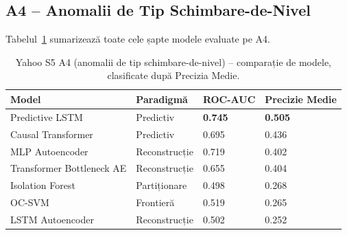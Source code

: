 \subsection{A4 -- Anomalii de Tip Schimbare-de-Nivel}

Tabelul~\ref{tab:yahoo-a4} sumarizează toate cele șapte modele evaluate pe A4.

\begin{table}[h]
\centering
\begin{tabular}{@{}llll@{}}
\toprule
Model & Paradigmă & ROC-AUC & Precizie Medie \\
\midrule
Predictive LSTM            & Predictiv     & \textbf{0.745} & \textbf{0.505} \\
Causal Transformer         & Predictiv     & 0.695          & 0.436 \\
MLP Autoencoder            & Reconstrucție & 0.719          & 0.402 \\
Transformer Bottleneck AE  & Reconstrucție & 0.655          & 0.404 \\
Isolation Forest           & Partiționare      & 0.498          & 0.268 \\
OC-SVM                     & Frontieră       & 0.519          & 0.265 \\
LSTM Autoencoder           & Reconstrucție & 0.502          & 0.252 \\
\bottomrule
\end{tabular}
\caption{Yahoo S5 A4 (anomalii de tip schimbare-de-nivel) -- comparație de modele, clasificate după Precizia Medie.}
\label{tab:yahoo-a4}
\end{table}

